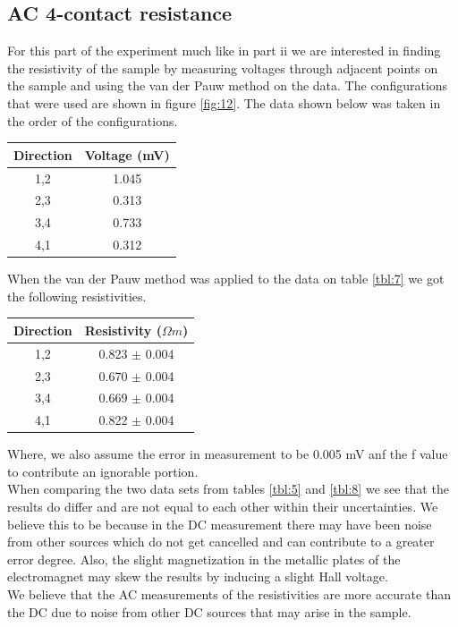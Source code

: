 \documentclass[twocolumn]{article}
\begin{document}
\subsection{AC 4-contact resistance}
For this part of the experiment much like in part ii we are interested in 
finding the resistivity of the sample by measuring voltages through adjacent 
points on the sample and using the van der Pauw method on the data. The 
configurations that were used are shown in figure \ref{fig:12}. The data shown 
below was taken in the order of the configurations.
\begin{minipage}{\linewidth}
\Centering
\begin{tabular}{|c|c|}
\hline
Direction & Voltage (mV) \\ \hline
1,2 & 1.045 \\ \hline
2,3 & 0.313 \\ \hline
3,4 & 0.733 \\ \hline
4,1 & 0.312 \\ \hline
\end{tabular}
\label{tbl:7}
\end{minipage}
When the van der Pauw method was applied to the data on table \ref{tbl:7} we 
got the following resistivities.
\begin{minipage}{\linewidth}
\Centering
\begin{tabular}{|c|c|}
\hline
Direction & Resistivity ($\Omega m$) \\ \hline
1,2 & 0.823 $\pm$ 0.004 \\ \hline
2,3 & 0.670 $\pm$ 0.004 \\ \hline
3,4 & 0.669 $\pm$ 0.004 \\ \hline
4,1 & 0.822 $\pm$ 0.004 \\ \hline
\end{tabular}
\label{tbl:8}
\end{minipage}
Where, we also assume the error in measurement to be 0.005 mV anf the f value 
to contribute an ignorable portion.
\\
When comparing the two data sets from tables \ref{tbl:5} and \ref{tbl:8} we see 
that the results do differ and are not equal to each other within their 
uncertainties. We believe this to be because in the DC measurement there may 
have been noise from other sources which do not get cancelled and can 
contribute to a greater error degree. Also, the slight magnetization in the 
metallic plates of the electromagnet may skew the results by inducing a slight 
Hall voltage.
\\
We believe that the AC measurements of the resistivities are more accurate than 
the DC due to noise from other DC sources that may arise in the sample.
\end{document}
